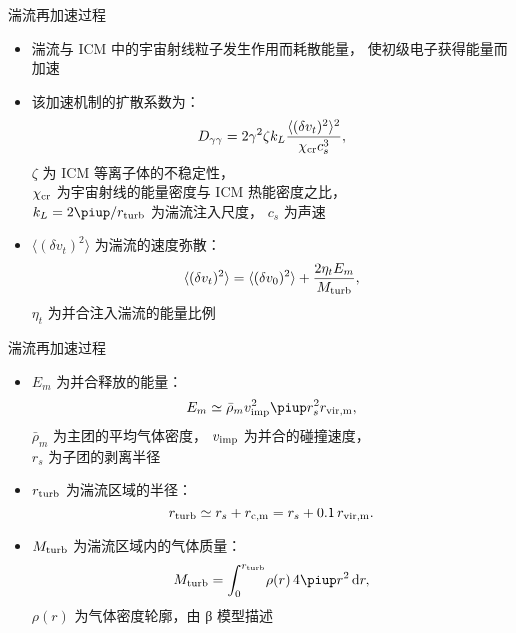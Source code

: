\documentclass{beamer}
\begin{document}
\begin{frame}
  \vspace{1ex}
  \begin{alertblock}{湍流再加速过程}
    \smallskip
    \begin{itemize}
      \item 湍流与 ICM 中的宇宙射线粒子发生作用而耗散能量，
        使初级电子获得能量而加速
      \item 该加速机制的扩散系数为：
        \begin{equation}
          D_{\gamma\gamma} =
            2 \gamma^2 \zeta k_L
            \frac{\langle (\delta v_t)^2 \rangle^2}{\chi_{\text{cr}} c_s^3} ,
        \end{equation}
        $\zeta$ 为 ICM 等离子体的不稳定性，\\
        $\chi_{\text{cr}}$ 为宇宙射线的能量密度与 ICM 热能密度之比，\\
        $k_L = 2\Cpi / r_{\R{turb}}$ 为湍流注入尺度，
        $c_s$ 为声速
      \item $\langle (\delta v_t)^2 \rangle$ 为湍流的速度弥散：
        \begin{equation}
          \langle (\delta v_t)^2 \rangle =
            \langle (\delta v_0)^2 \rangle +
            \frac{2 \eta_t E_m}{M_{\text{turb}}} ,
        \end{equation}
        $\eta_t$ 为并合注入湍流的能量比例
    \end{itemize}
  \end{alertblock}
\end{frame}

\begin{frame}
  \vspace{1ex}
  \begin{alertblock}{湍流再加速过程}
    \smallskip
    \begin{itemize}
      \item $E_m$ 为并合释放的能量：
        \begin{equation}
          E_m \simeq \bar{\rho}_m v_{\R{imp}}^2
            \Cpi r_s^2 r_{\R{vir,m}} ,
        \end{equation}
        $\bar{\rho}_m$ 为主团的平均气体密度，
        $v_{\text{imp}}$ 为并合的碰撞速度，\\
        $r_s$ 为子团的剥离半径
      \item $r_{\text{turb}}$ 为湍流区域的半径：
        \begin{equation}
          r_{\text{turb}} \simeq r_s + r_{\text{c,m}}
            = r_s + 0.1\,r_{\text{vir,m}} .
        \end{equation}
      \item $M_{\text{turb}}$ 为湍流区域内的气体质量：
        \begin{equation}
          M_{\R{turb}} =
            \int_0^{r_{\R{turb}}} \! \rho(r) \,4\Cpi r^2 \,\D{r} ,
        \end{equation}
        $\rho(r)$ 为气体密度轮廓，由 β 模型描述
    \end{itemize}
  \end{alertblock}
\end{frame}
\end{document}

